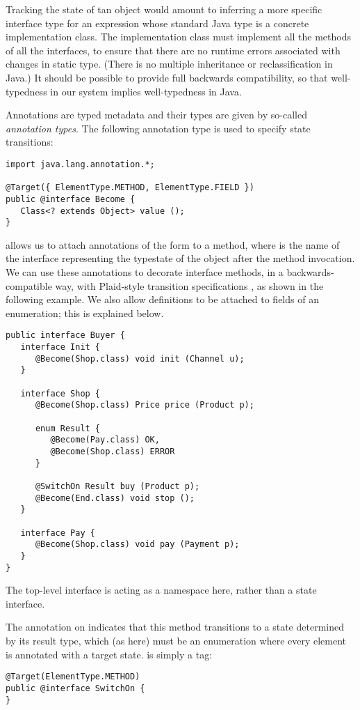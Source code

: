 Tracking the state of tan object would amount to inferring a more
specific interface type for an expression whose standard Java type is
a concrete implementation class. The implementation class must
implement all the methods of all the interfaces, to ensure that there
are no runtime errors associated with changes in static type. (There
is no multiple inheritance or reclassification in Java.) It should be
possible to provide full backwards compatibility, so that
well-typedness in our system implies well-typedness in Java.

Annotations are typed metadata and their types are given by so-called
\emph{annotation types}. The following annotation type  is
used to specify state transitions:

\begin{lstlisting}
import java.lang.annotation.*;

@Target({ ElementType.METHOD, ElementType.FIELD })
public @interface Become {
   Class<? extends Object> value ();
}
\end{lstlisting}

\noindent {} allows us to attach annotations of the form
 to a method, where  is the name
of the interface representing the typestate of the object after the
method invocation. We can use these annotations to decorate interface
methods, in a backwards-compatible way, with Plaid-style transition
specifications \cite{garcia14}, as shown in the following example. We
also allow  definitions to be attached to fields of an
enumeration; this is explained below.

\begin{lstlisting}
public interface Buyer {
   interface Init {
      @Become(Shop.class) void init (Channel u);
   }

   interface Shop {
      @Become(Shop.class) Price price (Product p);

      enum Result {
         @Become(Pay.class) OK,
         @Become(Shop.class) ERROR
      }

      @SwitchOn Result buy (Product p);
      @Become(End.class) void stop ();
   }

   interface Pay {
      @Become(Shop.class) void pay (Payment p);
   }
}
\end{lstlisting}

\noindent The top-level  interface is acting as a
namespace here, rather than a state interface.

The  annotation on  indicates that this method
transitions to a state determined by its result type, which (as here)
must be an enumeration where every element is annotated with a target
state.  is simply a tag:
\begin{lstlisting}
@Target(ElementType.METHOD)
public @interface SwitchOn {
}
\end{lstlisting}

